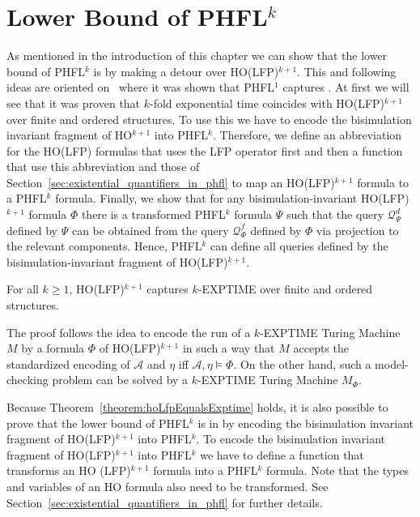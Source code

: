 
\section{Lower Bound of PHFL$^k$}\label{sec:lowerBoundOfPhfl}

As mentioned in the introduction of this chapter we can show that the lower bound of PHFL$^k$ is  by
making a detour over HO(LFP)$^{k+1}$. This and following ideas are oriented on~\cite{lange2014capturing} where it was
shown that PHFL$^1$ captures . At first we will see that it was proven that $k$-fold exponential time coincides with HO(LFP)$^{k+1}$ over finite and ordered structures. To use this we have to encode the
bisimulation invariant fragment of HO$^{k+1}$ into PHFL$^k$. Therefore, we define an abbreviation for the HO(LFP)
formulas that uses the LFP operator first and then a function that use this abbreviation and those of
Section~\ref{sec:existential_quantifiers_in_phfl} to map an HO(LFP)$^{k+1}$ formula to a PHFL$^k$ formula. Finally, we
show that for any bisimulation-invariant HO(LFP)$^{k+1}$ formula $\Phi$ there is a transformed PHFL$^k$ formula $\Psi$ such that the query $\mathcal{Q}^d_\Psi$ defined by $\Psi$ can be obtained from the query $\mathcal{Q}^f_\Phi$ defined by $\Phi$ via projection to the relevant components. Hence, PHFL$^k$ can define all queries defined by the bisimulation-invariant fragment of HO(LFP)$^{k+1}$.

\begin{theorem}{\cite{freireMartins2011descriptive}}\label{theorem:hoLfpEqualsExptime}
    For all $k \geq 1$, HO(LFP)$^{k + 1}$ captures $k$-EXPTIME over finite and ordered structures.
\end{theorem}

The proof follows the idea to encode the run of a $k$-EXPTIME Turing Machine $M$ by a formula $\Phi$ of HO(LFP)$^{k +
1}$ in such a way that $M$ accepts the standardized encoding of $\mathcal{A}$ and $\eta$ iff $\mathcal{A}, \eta \models \Phi$. On the other hand, such a model-checking problem can be solved by a $k$-EXPTIME Turing Machine $M_\Phi$.

Because Theorem~\ref{theorem:hoLfpEqualsExptime} holds, it is also possible to prove that the lower bound of PHFL$^k$
is in  by encoding the bisimulation invariant fragment of HO(LFP)$^{k + 1}$ into PHFL$^k$. To encode the
bisimulation invariant fragment of HO(LFP)$^{k + 1}$ into PHFL$^k$ we have to define a function that transforms an HO
(LFP)$^{k + 1}$ formula into a PHFL$^k$ formula. Note that the types and variables of an HO formula also need to be
transformed. See Section~\ref{sec:existential_quantifiers_in_phfl} for further details.


